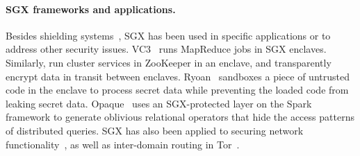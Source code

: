 \paragraph{SGX frameworks and applications.}
Besides shielding systems~\cite{baumann14haven,osdi16scone,shinde17panoply},
SGX has been used in specific applications or to address other security issues.
VC3~\cite{vc3} runs MapReduce jobs in SGX enclaves.
Similarly, \citet{zookeeper}
run cluster services in ZooKeeper in an enclave, and transparently encrypt data in transit between enclaves.
Ryoan~\cite{hunt16ryoan} sandboxes a piece of untrusted code in the enclave
to process secret data while preventing the loaded code from leaking secret data.
Opaque~\cite{zheng2017opaque} uses an SGX-protected layer on the Spark framework to generate oblivious relational operators that hide the access patterns of distributed queries.
SGX has also been applied to securing network functionality~\cite{shih2016s},
as well as inter-domain routing in Tor~\cite{kim2015first}.

